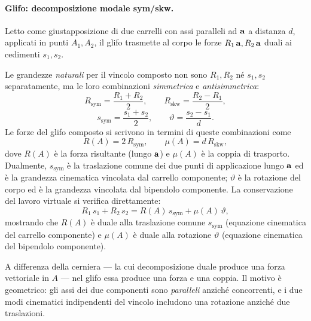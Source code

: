 \paragraph{Glifo: decomposizione modale sym/skw.}
Letto come giustapposizione di due carrelli con assi
paralleli ad $\mathbf{a}$ a distanza $d$, applicati in punti
$A_1, A_2$, il glifo trasmette al corpo le forze
$R_1\,\mathbf{a}, R_2\,\mathbf{a}$ duali ai cedimenti $s_1, s_2$.

Le grandezze \emph{naturali} per il vincolo composto non
sono $R_1, R_2$ né $s_1, s_2$ separatamente, ma le loro
combinazioni \emph{simmetrica} e \emph{antisimmetrica}:
\begin{equation}\label{eq:sym_skw_R}
	R_\text{sym} = \frac{R_1 + R_2}{2},
	\qquad
	R_\text{skw} = \frac{R_2 - R_1}{2},
\end{equation}
\begin{equation}\label{eq:sym_skw_s}
	s_\text{sym} = \frac{s_1 + s_2}{2},
	\qquad
	\vartheta = \frac{s_2 - s_1}{d}.
\end{equation}
Le forze del glifo composto si scrivono in termini di
queste combinazioni come
\begin{equation}\label{eq:glifo_R_mu}
	R(A) = 2\,R_\text{sym},
	\qquad
	\mu(A) = d\,R_\text{skw},
\end{equation}
dove $R(A)$ è la forza risultante (lungo $\mathbf{a}$) e $\mu(A)$
è la coppia di trasporto. Dualmente, $s_\text{sym}$ è la
traslazione comune dei due punti di applicazione lungo
$\mathbf{a}$ ed è la grandezza cinematica vincolata dal carrello
componente; $\vartheta$ è la rotazione del corpo ed è la
grandezza vincolata dal bipendolo componente. La
conservazione del lavoro virtuale si verifica direttamente:
\begin{equation}\label{eq:lavoro_glifo}
	R_1\,s_1 + R_2\,s_2
	= R(A)\,s_\text{sym} + \mu(A)\,\vartheta,
\end{equation}
mostrando che $R(A)$ è duale alla traslazione comune
$s_\text{sym}$ (equazione cinematica del carrello
componente) e $\mu(A)$ è duale alla rotazione $\vartheta$
(equazione cinematica del bipendolo componente).

A differenza della cerniera --- la cui decomposizione
duale produce una forza vettoriale in $A$ --- nel glifo
essa produce una forza e una coppia. Il motivo è
geometrico: gli assi dei due componenti sono
\emph{paralleli} anziché concorrenti, e i due modi
cinematici indipendenti del vincolo includono una
rotazione anziché due traslazioni.

